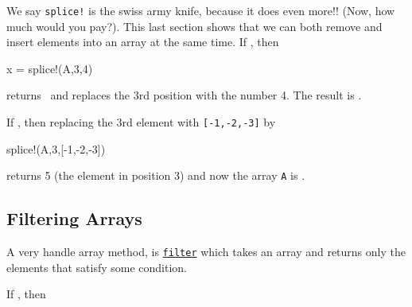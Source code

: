 \begin{description}[font=\sffamily\bfseries]
\item[Replacing elements from an array] We say \texttt{splice!} is the swiss army knife, because it does even more!! (Now, how much would you pay?).  This last section shows that we can both remove and insert elements into an array at the same time. 
If , then

\begin{jlblock}[array]
x = splice!(A,3,4)
\end{jlblock}
%
returns  \printpythontex[verb]~and replaces the 3rd position with the number 4. The result is \printpythontex[verbatim]. 

If , then replacing the 3rd element with \verb![-1,-2,-3]! by
%
\begin{jlblock}[array]
splice!(A,3,[-1,-2,-3])
\end{jlblock}
returns 5 (the element in position 3) and now the array \verb!A! is  \printpythontex[verbatim].



\end{description}

\subsection{Filtering Arrays}

A very handle array method, is \href{https://docs.julialang.org/en/v1/base/collections/#Base.filter}{\texttt{filter}} which takes an array and
returns only the elements that satisfy some condition.

If , then

